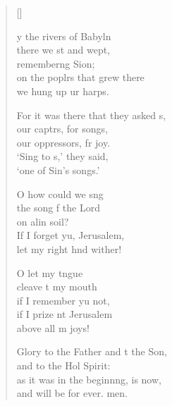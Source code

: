 \settowidth{\versewidth}{For it was there that they asked us, +}
\begin{verse}[\versewidth]
  \begin{patverse}
y the rivers of Babyln\Flex\\
    there we st and wept,\Med\\
    remember\pointup{\i}ng Sion;\\
on the poplrs that grew there\Med\\
    we hung up ur harps.

For it was there that they asked s,\Flex\\
    our captrs, for songs,\Med\\
    our oppressors, fr joy.\\
‘Sing to s,’ they said,\Med\\
    ‘one of Sin’s songs.’

O how could we s\pointup{\i}ng\Flex\\
    the song f the Lord\Med\\
    on alin soil?\\
If I forget yu, Jerusalem,\Med\\
    let my right hnd wither!

O let my tngue\Flex\\
    cleave t my mouth\Med\\
    if I remember yu not,\\
if I prize nt Jerusalem\Med\\
    above all m joys!

Glory to the Father and t the Son,\Med\\
    and to the Hol Spirit:\\
as it was in the beginn\pointup{\i}ng, is now,\Med\\
    and will be for ever. men.
  \end{patverse}
\end{verse}
